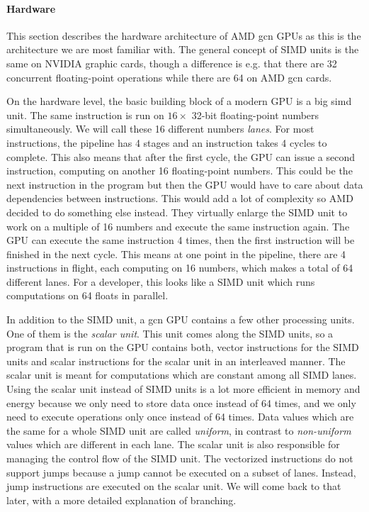 \paragraph{Hardware} This section describes the hardware architecture of AMD \gls{gcn} GPUs as this is the architecture we are most familiar with. The general concept of SIMD units is the same on NVIDIA graphic cards, though a difference is e.g. that there are 32 concurrent floating-point operations while there are 64 on AMD \gls{gcn} cards.

On the hardware level, the basic building block of a modern GPU is a big \gls{simd} unit. The same instruction is run on $16 \times$ 32-bit floating-point numbers simultaneously. We will call these 16 different numbers \emph{lanes}. For most instructions, the pipeline has 4 stages and an instruction takes 4 cycles to complete. This also means that after the first cycle, the GPU can issue a second instruction, computing on another 16 floating-point numbers. This could be the next instruction in the program but then the GPU would have to care about data dependencies between instructions. This would add a lot of complexity so AMD decided to do something else instead. They virtually enlarge the SIMD unit to work on a multiple of 16 numbers and execute the same instruction again. The GPU can execute the same instruction 4 times, then the first instruction will be finished in the next cycle. This means at one point in the pipeline, there are 4 instructions in flight, each computing on 16 numbers, which makes a total of 64 different lanes. For a developer, this looks like a SIMD unit which runs computations on 64 floats in parallel.

In addition to the SIMD unit, a \gls{gcn} GPU contains a few other processing units. One of them is the \emph{scalar unit}. This unit comes along the SIMD units, so a program that is run on the GPU contains both, vector instructions for the SIMD units and scalar instructions for the scalar unit in an interleaved manner. The scalar unit is meant for computations which are constant among all SIMD lanes. Using the scalar unit instead of SIMD units is a lot more efficient in memory and energy because we only need to store data once instead of 64 times, and we only need to execute operations only once instead of 64 times. Data values which are the same for a whole SIMD unit are called \emph{uniform}, in contrast to \emph{non-uniform} values which are different in each lane. The scalar unit is also responsible for managing the control flow of the SIMD unit. The vectorized instructions do not support jumps because a jump cannot be executed on a subset of lanes. Instead, jump instructions are executed on the scalar unit. We will come back to that later, with a more detailed explanation of branching.

